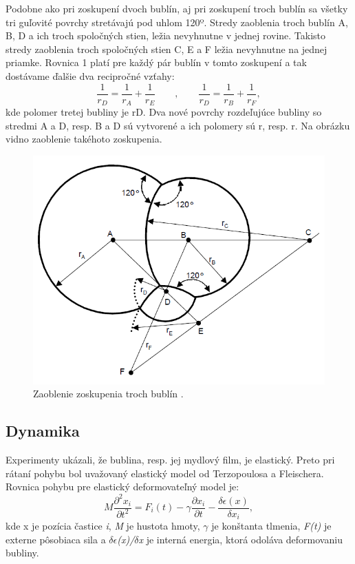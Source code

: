 Podobne ako pri zoskupení dvoch bublín, aj pri zoskupení troch bublín sa všetky tri guľovité povrchy stretávajú pod uhlom 120º. Stredy zaoblenia troch bublín A, B, D a ich troch spoločných stien, ležia nevyhnutne v jednej rovine. Takisto stredy zaoblenia troch spoločných stien C, E a F ležia nevyhnutne na jednej priamke. Rovnica 1 platí pre každý pár bublín v tomto zoskupení a tak dostávame ďalšie dva recipročné vzťahy:
\begin{equation}
	\frac{1}{r_{D}} = \frac{1}{r_{A}} + \frac{1}{r_{E}} \qquad,\qquad \frac{1}{r_{D}} = \frac{1}{r_{B}} + \frac{1}{r_{F}},
\end{equation}
kde polomer tretej bubliny je rD. Dva nové povrchy rozdeľujúce bubliny so stredmi A a D, resp. B a D sú vytvorené a ich polomery sú r, resp. r. Na obrázku  vidno zaoblenie takéhoto zoskupenia.
\begin{figure}[H]
	\begin{center}
		\includegraphics[height=\imageHeight]{images/durikovic/curvature_of_tripple_bubble_shells}
		\caption{Zaoblenie zoskupenia troch bublín \cite{durikovic2001}.}
		\label{img:curvature_of_tripple_bubble_shells}
	\end{center}
\end{figure}

\subsection{Dynamika}

Experimenty ukázali, že bublina, resp. jej mydlový film, je elastický. Preto pri rátaní pohybu bol uvažovaný elastický model od Terzopoulosa a Fleischera. Rovnica pohybu pre elastický deformovateľný model je:
\begin{equation}
	M\frac{\partial^{2} x_{i}}{\partial t^{2}} = F_{i}(t)-\gamma\frac{\partial x_{i}}{\partial t}-\frac{\delta \epsilon (x)}{\delta x_{i}},
\end{equation}
kde x je pozícia častice \textit{i}, \textit{M} je hustota hmoty, \textit{$\gamma$} je konštanta tlmenia, \textit{F(t)} je externe pôsobiaca sila a \textit{$\delta \epsilon$(x)/$\delta$x}  je interná energia, ktorá odoláva deformovaniu bubliny.

